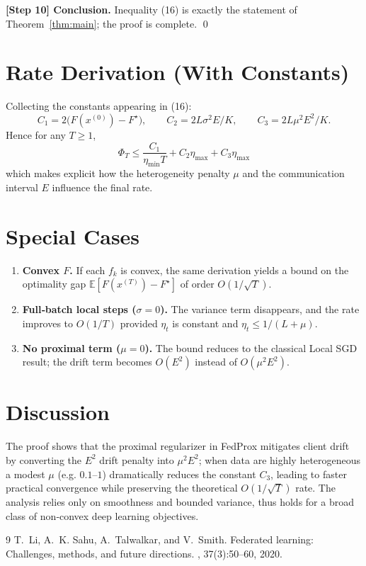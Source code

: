 \documentclass{article}
\newcommand{\E}{\mathbb{E}}
\begin{document}
\medskip
\noindent\textbf{[Step 10] Conclusion.}  
Inequality (16) is exactly the statement of Theorem~\ref{thm:main};
the proof is complete. \qed

\section*{Rate Derivation (With Constants)}
Collecting the constants appearing in (16):
\[
C_{1}=2\bigl(F(x^{(0)})-F^\star\bigr),\qquad
C_{2}=2L\sigma^{2}E/K,\qquad
C_{3}=2L\mu^{2}E^{2}/K .
\]
Hence for any $T\ge1$,
\[
\boxed{\;
\Phi_T\le \frac{C_{1}}{\eta_{\min}T}+C_{2}\eta_{\max}+C_{3}\eta_{\max}
\;}
\]
which makes explicit how the heterogeneity penalty $\mu$ and the
communication interval $E$ influence the final rate.

\section*{Special Cases}
\begin{enumerate}[label=(\alph*)]
\item \textbf{Convex $F$.} If each $f_k$ is convex, the same derivation yields a
      bound on the optimality gap $\E[F(x^{(T)})-F^\star]$ of order
      $O(1/\sqrt{T})$.
\item \textbf{Full‑batch local steps ($\sigma=0$).} The variance term disappears,
      and the rate improves to $O(1/T)$ provided $\eta_t$ is constant and
      $\eta_t\le 1/(L+\mu)$.
\item \textbf{No proximal term ($\mu=0$).} The bound reduces to the classical
      Local SGD result; the drift term becomes $O(E^{2})$ instead of $O(\mu^{2}E^{2})$.
\end{enumerate}

\section*{Discussion}
The proof shows that the proximal regularizer in FedProx mitigates client drift
by converting the $E^{2}$ drift penalty into $ \mu^{2}E^{2}$; when data are
highly heterogeneous a modest $\mu$ (e.g. $0.1$–$1$) dramatically reduces the
constant $C_{3}$, leading to faster practical convergence while preserving the
theoretical $O(1/\sqrt{T})$ rate. The analysis relies only on smoothness and
bounded variance, thus holds for a broad class of non‑convex deep learning
objectives.

\begin{thebibliography}{9}
T.~Li, A.~K. Sahu, A.~Talwalkar, and V.~Smith.
\newblock Federated learning: Challenges, methods, and future directions.
, 37(3):50--60, 2020.
\end{thebibliography}
\end{document}

